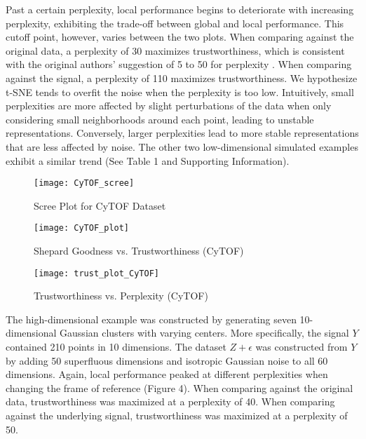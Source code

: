 \documentclass{article}
\begin{document}
Past a certain perplexity, local performance begins to deteriorate with increasing perplexity, exhibiting the trade-off between global and local performance. This cutoff point, however, varies between the two plots. When comparing against the original data, a perplexity of 30 maximizes trustworthiness, which is consistent with the original authors' suggestion of 5 to 50 for perplexity \cite{t-SNE}. When comparing against the signal, a perplexity of 110 maximizes trustworthiness. We hypothesize t-SNE tends to overfit the noise when the perplexity is too low. Intuitively, small perplexities are more affected by slight perturbations of the data when only considering small neighborhoods around each point, leading to unstable representations. Conversely, larger perplexities lead to more stable representations that are less affected by noise. The other two low-dimensional simulated examples exhibit a similar trend (See Table 1 and Supporting Information).

\renewcommand{\thefigure}{5}
\begin{figure*}[b]
\texttt{[image: CyTOF\_scree]}
\centering
\caption{Scree Plot for CyTOF Dataset}
\end{figure*}

\renewcommand{\thefigure}{6a}
\begin{figure*}[t]
\texttt{[image: CyTOF\_plot]}
\centering
\caption{Shepard Goodness vs. Trustworthiness (CyTOF)}
\end{figure*}

\renewcommand{\thefigure}{6b}
\begin{figure*}[b]
\texttt{[image: trust\_plot\_CyTOF]}
\centering
\caption{Trustworthiness vs. Perplexity (CyTOF)}
\end{figure*}

The high-dimensional example was constructed by generating seven 10-dimensional Gaussian clusters with varying centers. More specifically, the signal $Y$ contained 210 points in 10 dimensions. The dataset $Z + \epsilon$ was constructed from $Y$ by adding 50 superfluous dimensions and isotropic Gaussian noise to all 60 dimensions. Again, local performance peaked at different perplexities when changing the frame of reference (Figure 4). When comparing against the original data, trustworthiness was maximized at a perplexity of 40. When comparing against the underlying signal, trustworthiness was maximized at a perplexity of 50.
\end{document}

